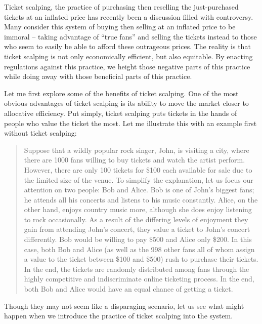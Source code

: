 
Ticket scalping, the practice of purchasing then reselling the just-purchased tickets at an inflated price has recently been a discussion filled with controversy. Many consider this system of buying then selling at an inflated price to be immoral – taking advantage of “true fans” and selling the tickets instead to those who seem to easily be able to afford these outrageous prices. The reality is that ticket scalping is not only economically efficient, but also equitable. By enacting regulations against this practice, we height those negative parts of this practice while doing away with those beneficial parts of this practice. 

Let me first explore some of the benefits of ticket scalping. One of the most obvious advantages of ticket scalping is its ability to move the market closer to allocative efficiency. Put simply, ticket scalping puts tickets in the hands of people who value the ticket the most. Let me illustrate this with an example first without ticket scalping: 

\begin{quote}
Suppose that a wildly popular rock singer, John, is visiting a city, where there are 1000 fans willing to buy tickets and watch the artist perform. However, there are only 100 tickets for \$100 each available for sale due to the limited size of the venue. To simplify the explanation, let us focus our attention on two people: Bob and Alice. Bob is one of John’s biggest fans; he attends all his concerts and listens to his music constantly. Alice, on the other hand, enjoys country music more, although she does enjoy listening to rock occasionally. As a result of the differing levels of enjoyment they gain from attending John’s concert, they value a ticket to John’s concert differently. Bob would be willing to pay \$500 and Alice only \$200. In this case, both Bob and Alice (as well as the 998 other fans all of whom assign a value to the ticket between \$100 and \$500) rush to purchase their tickets. In the end, the tickets are randomly distributed among fans through the highly competitive and indiscriminate online ticketing process. In the end, both Bob and Alice would have an equal chance of getting a ticket.  
\end{quote}

Though they may not seem like a disparaging scenario, let us see what might happen when we introduce the practice of ticket scalping into the system. 

